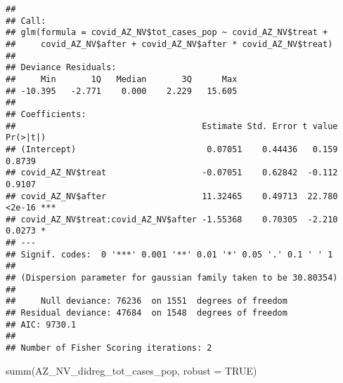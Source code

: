 \documentclass[
]{article}
\newenvironment{Shaded}{\begin{snugshade}}{\end{snugshade}}
\newcommand{\AttributeTok}[1]{\textcolor[rgb]{0.77,0.63,0.00}{#1}}
\newcommand{\ConstantTok}[1]{\textcolor[rgb]{0.00,0.00,0.00}{#1}}
\newcommand{\FunctionTok}[1]{\textcolor[rgb]{0.00,0.00,0.00}{#1}}
\newcommand{\NormalTok}[1]{#1}
\newcommand{\OtherTok}[1]{\textcolor[rgb]{0.56,0.35,0.01}{#1}}
\newcommand{\SpecialCharTok}[1]{\textcolor[rgb]{0.00,0.00,0.00}{#1}}
\begin{document}
\begin{Shaded}
\end{Shaded}

\begin{verbatim}
## 
## Call:
## glm(formula = covid_AZ_NV$tot_cases_pop ~ covid_AZ_NV$treat + 
##     covid_AZ_NV$after + covid_AZ_NV$after * covid_AZ_NV$treat)
## 
## Deviance Residuals: 
##     Min       1Q   Median       3Q      Max  
## -10.395   -2.771    0.000    2.229   15.605  
## 
## Coefficients:
##                                     Estimate Std. Error t value Pr(>|t|)    
## (Intercept)                          0.07051    0.44436   0.159   0.8739    
## covid_AZ_NV$treat                   -0.07051    0.62842  -0.112   0.9107    
## covid_AZ_NV$after                   11.32465    0.49713  22.780   <2e-16 ***
## covid_AZ_NV$treat:covid_AZ_NV$after -1.55368    0.70305  -2.210   0.0273 *  
## ---
## Signif. codes:  0 '***' 0.001 '**' 0.01 '*' 0.05 '.' 0.1 ' ' 1
## 
## (Dispersion parameter for gaussian family taken to be 30.80354)
## 
##     Null deviance: 76236  on 1551  degrees of freedom
## Residual deviance: 47684  on 1548  degrees of freedom
## AIC: 9730.1
## 
## Number of Fisher Scoring iterations: 2
\end{verbatim}

\begin{Shaded}
\begin{Highlighting}[]
\FunctionTok{summ}\NormalTok{(AZ\_NV\_didreg\_tot\_cases\_pop, }\AttributeTok{robust =} \ConstantTok{TRUE}\NormalTok{)}
\end{Highlighting}
\end{Shaded}
\end{document}

